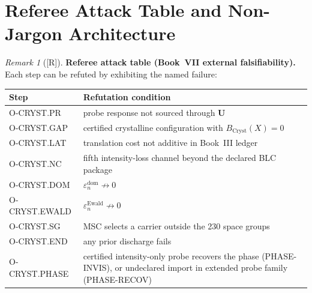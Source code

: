 \documentclass[12pt,oneside]{amsbook}
\theoremstyle{plain}
\theoremstyle{definition}
\theoremstyle{remark}
\newtheorem{remark}[theorem]{Remark}
\newcommand{\status}[1]{\textup{[#1]}}
\begin{document}
\section{Referee Attack Table and Non-Jargon Architecture}
\label{sec:cryst-referee}

\begin{remark}[\status{R}]\label{rem:cryst-referee-table}
\textbf{Referee attack table (Book~VII external falsifiability).}
Each step can be refuted by exhibiting the named failure:

\medskip
{\small
\noindent\begin{tabular}{|l|p{8.5cm}|}
\hline
\textbf{Step} & \textbf{Refutation condition} \\
\hline
O-CRYST.PR & probe response not sourced through $\mathbf{U}$ \\
O-CRYST.GAP & certified crystalline configuration with $B_{\mathrm{Cryst}}(X)=0$ \\
O-CRYST.LAT & translation cost not additive in Book~III ledger \\
O-CRYST.NC & fifth intensity-loss channel beyond the declared BLC package \\
O-CRYST.DOM & $\varepsilon^{\mathrm{dom}}_n \not\to 0$ \\
O-CRYST.EWALD & $\varepsilon^{\mathrm{Ewald}}_n \not\to 0$ \\
O-CRYST.SG & MSC selects a carrier outside the 230 space groups \\
O-CRYST.END & any prior discharge fails \\
O-CRYST.PHASE & certified intensity-only probe recovers the phase (PHASE-INVIS),
  or undeclared import in extended probe family (PHASE-RECOV) \\
\hline
\end{tabular}}
\end{remark}
\end{document}
